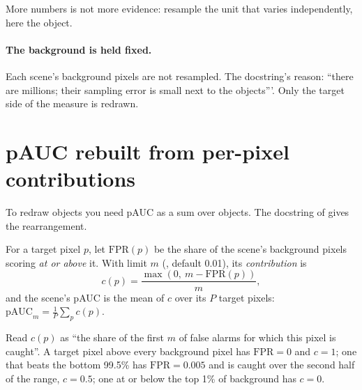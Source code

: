 \begin{keypoint}
More numbers is not more evidence: resample the unit that varies independently, here the object.
\end{keypoint}

\paragraph{The background is held fixed.} Each scene's background pixels are not resampled. The docstring's reason:
``there are millions; their sampling error is small next to the objects'''. Only the target side of the measure is
redrawn.

\section{pAUC rebuilt from per-pixel contributions}\label{sec:bootstrap:cp}

To redraw objects you need pAUC as a sum over objects. The docstring of  gives the
rearrangement.

\begin{definition}
For a target pixel $p$, let $\mathrm{FPR}(p)$ be the share of the scene's background pixels scoring \emph{at or above}
it. With limit $m$ (, default 0.01), its \emph{contribution} is
\begin{equation}\label{eq:bootstrap:c}
c(p) = \frac{\max(0,\ m - \mathrm{FPR}(p))}{m},
\end{equation}
and the scene's pAUC is the mean of $c$ over its $P$ target pixels:
$\mathrm{pAUC}_m = \frac1P\sum_p c(p)$.
\end{definition}

Read $c(p)$ as ``the share of the first $m$ of false alarms for which this pixel is caught''. A target pixel above every
background pixel has $\mathrm{FPR} = 0$ and $c = 1$; one that beats the bottom 99.5\% has $\mathrm{FPR} = 0.005$ and is
caught over the second half of the range, $c = 0.5$; one at or below the top 1\% of background has $c = 0$.

